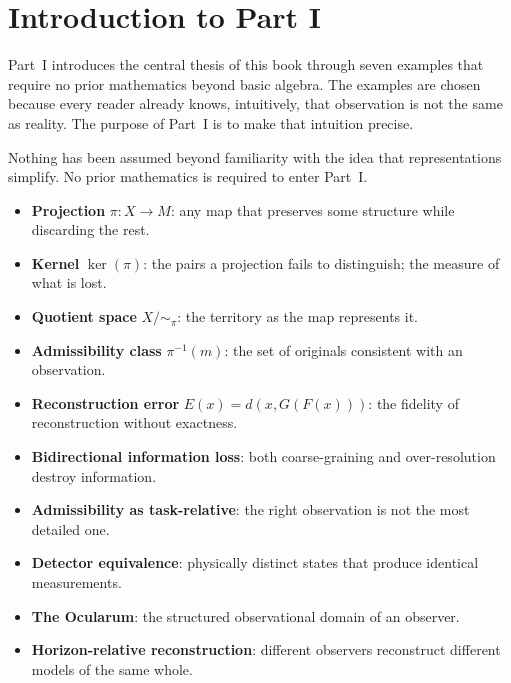 
\chapter*{Introduction to Part I}

Part~I introduces the central thesis of this book through seven
examples that require no prior mathematics beyond basic algebra.
The examples are chosen because every reader already knows,
intuitively, that observation is not the same as reality.
The purpose of Part~I is to make that intuition precise.

\begin{tcolorbox}[
  title={\textbf{Established So Far}},
  colback=boxgreen,colframe=green!50!black,
  fonttitle=\small\sffamily
]
Nothing has been assumed beyond familiarity with the idea that
representations simplify.
No prior mathematics is required to enter Part~I.
\end{tcolorbox}

\bigskip

\begin{tcolorbox}[
  title={\textbf{New Ideas Introduced in This Part}},
  colback=boxblue,colframe=blue!40!black,
  fonttitle=\small\sffamily
]
\begin{itemize}[leftmargin=1.5em,itemsep=2pt]
  \item \textbf{Projection} $\pi : X \to M$: any map that
    preserves some structure while discarding the rest.
  \item \textbf{Kernel} $\ker(\pi)$: the pairs a projection
    fails to distinguish; the measure of what is lost.
  \item \textbf{Quotient space} $X/{\sim_\pi}$: the territory
    as the map represents it.
  \item \textbf{Admissibility class} $\pi^{-1}(m)$: the set of
    originals consistent with an observation.
  \item \textbf{Reconstruction error} $E(x) = d(x, G(F(x)))$:
    the fidelity of reconstruction without exactness.
  \item \textbf{Bidirectional information loss}: both
    coarse-graining and over-resolution destroy information.
  \item \textbf{Admissibility as task-relative}: the right
    observation is not the most detailed one.
  \item \textbf{Detector equivalence}: physically distinct
    states that produce identical measurements.
  \item \textbf{The Ocularum}: the structured observational
    domain of an observer.
  \item \textbf{Horizon-relative reconstruction}: different
    observers reconstruct different models of the same whole.
\end{itemize}
\end{tcolorbox}

